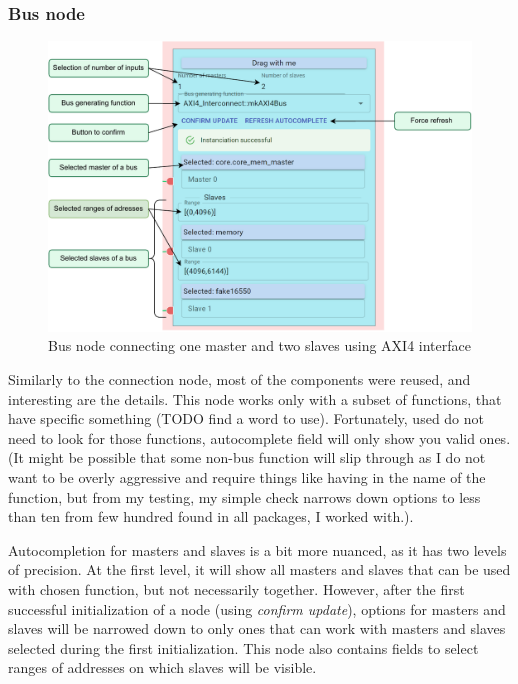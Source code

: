 \documentclass[12pt]{report}
\begin{document}
\subsubsection{Bus node}
\begin{figure}[!h]
\centering
\includegraphics[width=1\columnwidth]{pdfExports/LargeMap-BusNode.drawio.pdf}
\caption{Bus node connecting one master and two slaves using AXI4 interface}
\end{figure}

Similarly to the connection node, most of the components were reused, and interesting are the details. This node works only with a subset of functions, that have specific something (TODO find a word to use). Fortunately, used do not need to look for those functions, autocomplete field will only show you valid ones. (It might be possible that some non-bus function will slip through as I do not want to be overly aggressive and require things like having  in the name of the function, but from my testing, my simple check narrows down options to less than ten from few hundred found in all packages, I worked with.).

Autocompletion for masters and slaves is a bit more nuanced, as it has two levels of precision. At the first level, it will show all masters and slaves that can be used with chosen function, but not necessarily together. However, after the first successful initialization of a node (using \emph{confirm update}), options for masters and slaves will be narrowed down to only ones that can work with masters and slaves selected during the first initialization.
This node also contains fields to select ranges of addresses on which slaves will be visible. 
\newpage
\end{document}
